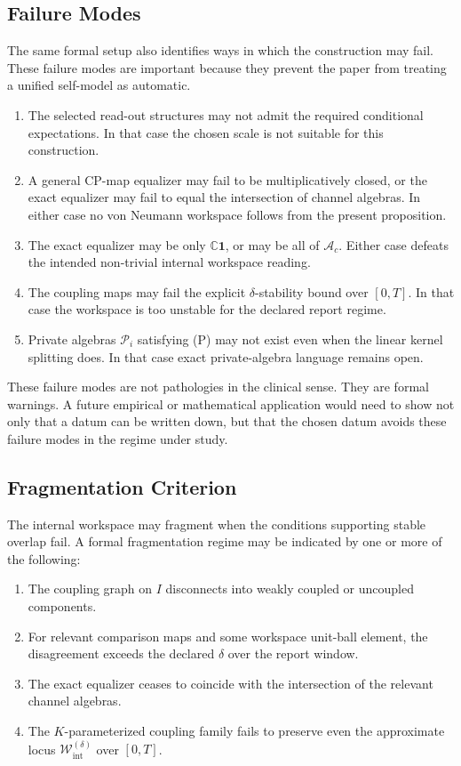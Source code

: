 \documentclass[12pt]{article}
\theoremstyle{definition}
\theoremstyle{remark}
\newcommand{\Ac}{\mathcal A_c}
\newcommand{\Wint}{\mathcal W_{\mathrm{int}}}
\begin{document}
\subsection{Failure Modes}

The same formal setup also identifies ways in which the construction may
fail. These failure modes are important because they prevent the paper
from treating a unified self-model as automatic.

\begin{enumerate}[label=(M\arabic*)]
\item The selected read-out structures may not admit the required
conditional expectations. In that case the chosen scale is not suitable
for this construction.
\item A general CP-map equalizer may fail to be multiplicatively closed,
or the exact equalizer may fail to equal the intersection of channel
algebras. In either case no von Neumann workspace follows from the
present proposition.
\item The exact equalizer may be only \(\mathbb C\mathbf1\), or may be all
of \(\Ac\). Either case defeats the intended non-trivial internal
workspace reading.
\item The coupling maps may fail the explicit \(\delta\)-stability bound
over \([0,T]\). In that case the workspace is too unstable for the
declared report regime.
\item Private algebras \(\mathcal P_i\) satisfying (P) may not exist even
when the linear kernel splitting does. In that case exact private-algebra
language remains open.
\end{enumerate}

These failure modes are not pathologies in the clinical sense. They are
formal warnings. A future empirical or mathematical application would
need to show not only that a datum can be written down, but that the
chosen datum avoids these failure modes in the regime under study.

\subsection{Fragmentation Criterion}

The internal workspace may fragment when the conditions supporting stable
overlap fail. A formal fragmentation regime may be indicated by one or
more of the following:
\begin{enumerate}[label=(F\arabic*)]
\item The coupling graph on \(I\) disconnects into weakly coupled or
uncoupled components.
\item For relevant comparison maps and some workspace unit-ball element,
the disagreement exceeds the declared \(\delta\) over the report window.
\item The exact equalizer ceases to coincide with the intersection of
the relevant channel algebras.
\item The \(K\)-parameterized coupling family fails to preserve even the
approximate locus \(\Wint^{(\delta)}\) over \([0,T]\).
\end{enumerate}
\end{document}
